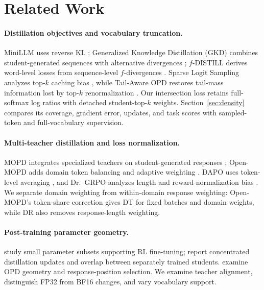 \section{Related Work}

\paragraph{Distillation objectives and vocabulary truncation.}
MiniLLM uses reverse KL \citep{gu2024minillm}; Generalized Knowledge Distillation (GKD) combines student-generated sequences with alternative divergences \citep{agarwal2024gkd}; $f$-DISTILL derives word-level losses from sequence-level $f$-divergences \citep{wen2023fdivergence}. Sparse Logit Sampling analyzes top-$k$ caching bias \citep{anshumann2025sparse}, while Tail-Aware OPD restores tail-mass information lost by top-$k$ renormalization \citep{huang2026tailaware}. Our intersection loss retains full-softmax log ratios with detached student-top-$k$ weights. Section~\ref{sec:density} compares its coverage, gradient error, updates, and task scores with sampled-token and full-vocabulary supervision.

\paragraph{Multi-teacher distillation and loss normalization.}
MOPD integrates specialized teachers on student-generated responses \citep{ma2026mopdmultiteacheronpolicydistillation}; Open-MOPD adds domain token balancing and adaptive weighting \citep{gao2026openmopddiagnosingfixingcapability}. DAPO uses token-level averaging \citep{yu2025dapo}, and Dr.~GRPO analyzes length and reward-normalization bias \citep{liu2025understandingr1zero}. We separate domain weighting from within-domain response weighting: Open-MOPD's token-share correction gives DT for fixed batches and domain weights, while DR also removes response-length weighting.

\paragraph{Post-training parameter geometry.}
\citet{mukherjee2025subnetworks} study small parameter subsets supporting RL fine-tuning; \citet{yu2026denseupdates} report concentrated distillation updates and overlap between separately trained students. \citet{shen2026opdgeometry} examine OPD geometry and response-position selection. We examine teacher alignment, distinguish FP32 from BF16 changes, and vary vocabulary support.
